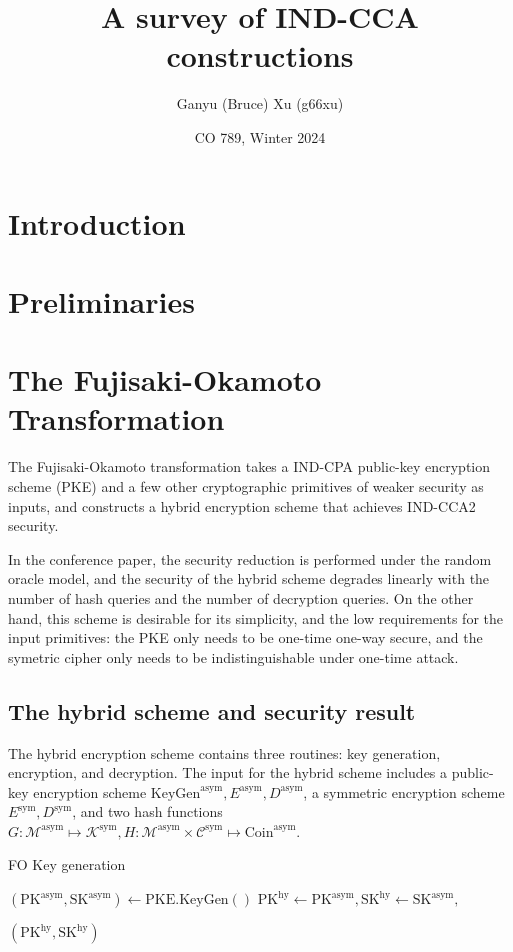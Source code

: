 \documentclass{article}
\title{A survey of IND-CCA constructions}
\author{Ganyu (Bruce) Xu (g66xu)}
\date{CO 789, Winter 2024}
\begin{document}
\maketitle

\section{Introduction}

\section{Preliminaries}

\section{The Fujisaki-Okamoto Transformation}
The Fujisaki-Okamoto transformation \cite{fujisaki1999secure} takes a IND-CPA public-key encryption scheme (PKE) and a few other cryptographic primitives of weaker security as inputs, and constructs a hybrid encryption scheme that achieves IND-CCA2 security.

In the conference paper, the security reduction is performed under the random oracle model, and the security of the hybrid scheme degrades linearly with the number of hash queries and the number of decryption queries. On the other hand, this scheme is desirable for its simplicity, and the low requirements for the input primitives: the PKE only needs to be one-time one-way secure, and the symetric cipher only needs to be indistinguishable under one-time attack.


\subsection{The hybrid scheme and security result}
The hybrid encryption scheme contains three routines: key generation, encryption, and decryption. The input for the hybrid scheme includes a public-key encryption scheme $\text{KeyGen}^\text{asym}, E^\text{asym}, D^\text{asym}$, a symmetric encryption scheme $E^\text{sym}, D^\text{sym}$, and two hash functions $G: \mathcal{M}^\text{asym} \mapsto \mathcal{K}^\text{sym}, H: \mathcal{M}^\text{asym} \times \mathcal{C}^\text{sym} \mapsto \text{Coin}^\text{asym}$.

\begin{algorithm}
\caption{FO Key generation}\label{fo-key-gen}
\begin{algorithmic}[1]  %
    \State $
        (\text{PK}^\text{asym}, \text{SK}^\text{asym}) 
        \leftarrow \text{PKE.KeyGen}()
    $
    \State $
        \text{PK}^\text{hy} \leftarrow \text{PK}^\text{asym},
        \text{SK}^\text{hy} \leftarrow \text{SK}^\text{asym},
    $

    \State \Return $(\text{PK}^\text{hy}, \text{SK}^\text{hy})$
\end{algorithmic}
\end{algorithm}
\end{document}
